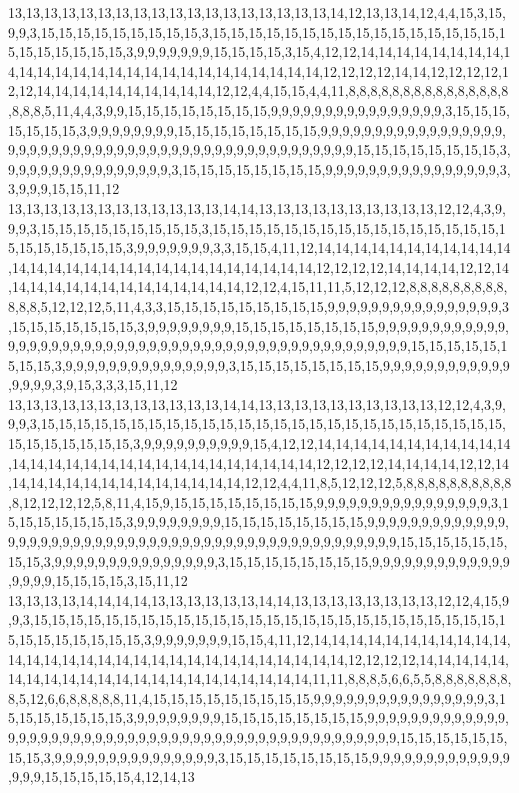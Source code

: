13,13,13,13,13,13,13,13,13,13,13,13,13,13,13,13,13,13,14,12,13,13,14,12,4,4,15,3,15,9,9,3,15,15,15,15,15,15,15,15,15,3,15,15,15,15,15,15,15,15,15,15,15,15,15,15,15,15,15,15,15,15,15,15,15,3,9,9,9,9,9,9,9,15,15,15,15,3,15,4,12,12,14,14,14,14,14,14,14,14,14,14,14,14,14,14,14,14,14,14,14,14,14,14,14,14,14,14,12,12,12,12,14,14,12,12,12,12,12,12,14,14,14,14,14,14,14,14,14,14,12,12,4,4,15,15,4,4,11,8,8,8,8,8,8,8,8,8,8,8,8,8,8,8,8,8,8,5,11,4,4,3,9,9,15,15,15,15,15,15,15,15,9,9,9,9,9,9,9,9,9,9,9,9,9,9,9,9,3,15,15,15,15,15,15,15,3,9,9,9,9,9,9,9,9,15,15,15,15,15,15,15,15,9,9,9,9,9,9,9,9,9,9,9,9,9,9,9,9,9,9,9,9,9,9,9,9,9,9,9,9,9,9,9,9,9,9,9,9,9,9,9,9,9,9,9,9,9,9,9,9,9,15,15,15,15,15,15,15,15,3,9,9,9,9,9,9,9,9,9,9,9,9,9,9,9,3,15,15,15,15,15,15,15,15,9,9,9,9,9,9,9,9,9,9,9,9,9,9,9,9,3,3,9,9,9,15,15,11,12
13,13,13,13,13,13,13,13,13,13,13,13,14,14,13,13,13,13,13,13,13,13,13,13,12,12,4,3,9,9,9,3,15,15,15,15,15,15,15,15,15,3,15,15,15,15,15,15,15,15,15,15,15,15,15,15,15,15,15,15,15,15,15,15,15,3,9,9,9,9,9,9,9,3,3,15,15,4,11,12,14,14,14,14,14,14,14,14,14,14,14,14,14,14,14,14,14,14,14,14,14,14,14,14,14,14,14,14,12,12,12,12,14,14,14,14,12,12,14,14,14,14,14,14,14,14,14,14,14,14,14,14,12,12,4,15,11,11,5,12,12,12,8,8,8,8,8,8,8,8,8,8,8,8,5,12,12,12,5,11,4,3,3,15,15,15,15,15,15,15,15,15,9,9,9,9,9,9,9,9,9,9,9,9,9,9,9,9,3,15,15,15,15,15,15,15,3,9,9,9,9,9,9,9,9,15,15,15,15,15,15,15,15,9,9,9,9,9,9,9,9,9,9,9,9,9,9,9,9,9,9,9,9,9,9,9,9,9,9,9,9,9,9,9,9,9,9,9,9,9,9,9,9,9,9,9,9,9,9,9,9,9,15,15,15,15,15,15,15,15,3,9,9,9,9,9,9,9,9,9,9,9,9,9,9,9,3,15,15,15,15,15,15,15,15,9,9,9,9,9,9,9,9,9,9,9,9,9,9,9,9,3,9,15,3,3,3,15,11,12
13,13,13,13,13,13,13,13,13,13,13,13,14,14,13,13,13,13,13,13,13,13,13,13,12,12,4,3,9,9,9,3,15,15,15,15,15,15,15,15,15,15,15,15,15,15,15,15,15,15,15,15,15,15,15,15,15,15,15,15,15,15,15,15,15,3,9,9,9,9,9,9,9,9,9,9,15,4,12,12,14,14,14,14,14,14,14,14,14,14,14,14,14,14,14,14,14,14,14,14,14,14,14,14,14,14,14,14,12,12,12,12,14,14,14,14,12,12,14,14,14,14,14,14,14,14,14,14,14,14,14,14,12,12,4,4,11,8,5,12,12,12,5,8,8,8,8,8,8,8,8,8,8,8,12,12,12,12,5,8,11,4,15,9,15,15,15,15,15,15,15,15,9,9,9,9,9,9,9,9,9,9,9,9,9,9,9,9,3,15,15,15,15,15,15,15,3,9,9,9,9,9,9,9,9,15,15,15,15,15,15,15,15,9,9,9,9,9,9,9,9,9,9,9,9,9,9,9,9,9,9,9,9,9,9,9,9,9,9,9,9,9,9,9,9,9,9,9,9,9,9,9,9,9,9,9,9,9,9,9,9,9,15,15,15,15,15,15,15,15,3,9,9,9,9,9,9,9,9,9,9,9,9,9,9,9,3,15,15,15,15,15,15,15,15,9,9,9,9,9,9,9,9,9,9,9,9,9,9,9,9,9,15,15,15,15,3,15,11,12
13,13,13,13,14,14,14,14,13,13,13,13,13,13,14,14,13,13,13,13,13,13,13,13,12,12,4,15,9,9,3,15,15,15,15,15,15,15,15,15,15,15,15,15,15,15,15,15,15,15,15,15,15,15,15,15,15,15,15,15,15,15,15,15,15,3,9,9,9,9,9,9,9,15,15,4,11,12,14,14,14,14,14,14,14,14,14,14,14,14,14,14,14,14,14,14,14,14,14,14,14,14,14,14,14,14,14,14,12,12,12,12,14,14,14,14,14,14,14,14,14,14,14,14,14,14,14,14,14,14,14,14,14,14,11,11,8,8,8,5,6,6,5,5,8,8,8,8,8,8,8,8,5,12,6,6,8,8,8,8,8,11,4,15,15,15,15,15,15,15,15,15,9,9,9,9,9,9,9,9,9,9,9,9,9,9,9,9,3,15,15,15,15,15,15,15,3,9,9,9,9,9,9,9,9,15,15,15,15,15,15,15,15,9,9,9,9,9,9,9,9,9,9,9,9,9,9,9,9,9,9,9,9,9,9,9,9,9,9,9,9,9,9,9,9,9,9,9,9,9,9,9,9,9,9,9,9,9,9,9,9,9,15,15,15,15,15,15,15,15,3,9,9,9,9,9,9,9,9,9,9,9,9,9,9,9,3,15,15,15,15,15,15,15,15,9,9,9,9,9,9,9,9,9,9,9,9,9,9,9,9,15,15,15,15,15,4,12,14,13
